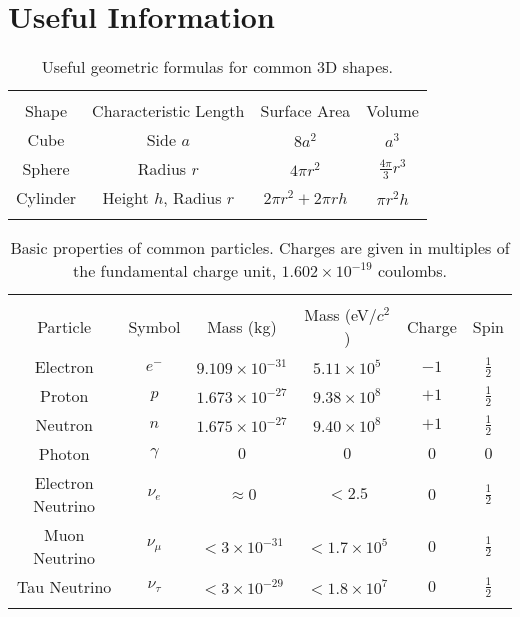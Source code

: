 \documentclass[12pt]{article}
\begin{document}
\section{Useful Information}

\begin{table}[!h]
\begin{tabular}{cccc}
\hline\hline\\
Shape & Characteristic Length & Surface Area & Volume \\
\hline
Cube & Side $a$ & $8a^2$ & $a^3$\\
Sphere & Radius $r$ & $4\pi r^2$ & $\frac{4\pi}{3}r^3$\\
Cylinder & Height $h$, Radius $r$ & $2\pi r^2  + 2\pi rh$
& $\pi r^2 h$ \\
\hline\hline\\
\end{tabular}
\caption{Useful geometric formulas for common 3D shapes.}
\end{table}

\begin{table}[!h]
\begin{tabular}{cccccc}
\hline\hline\\
Particle & Symbol & Mass (kg) & Mass (eV/$c^2$) & Charge & Spin \\
\hline
Electron &$e^-$& $9.109\times10^{-31}$ & $5.11\times10^5$ 
  & $-1$ & $\frac{1}{2}$\\
Proton & $p$ & $1.673\times10^{-27}$ & $9.38\times10^8$ 
  & $+1$ & $\frac{1}{2}$\\
Neutron & $n$ &  $1.675\times10^{-27}$ & $9.40\times10^8$ 
  & $+1$ & $\frac{1}{2}$\\
Photon & $\gamma$ & $0$ & $0$ & $0$ & $0$\\
Electron Neutrino & $\nu_e$& $\approx 0$ & $< 2.5$ & $0$ & $\frac{1}{2}$\\
Muon Neutrino & $\nu_\mu$ & $< 3\times10^{-31}$ & $< 1.7\times10^5$ 
  & $0$ & $\frac{1}{2}$\\
Tau Neutrino & $\nu_\tau$ & $< 3\times10^{-29}$ & $< 1.8\times10^7$ 
  & $0$ & $\frac{1}{2}$\\
\hline\hline\\
\end{tabular}
\caption{Basic properties of common particles.  Charges are given
in multiples of the fundamental charge unit, $1.602\times10^{-19}$ coulombs.}
\end{table}
\end{document}
